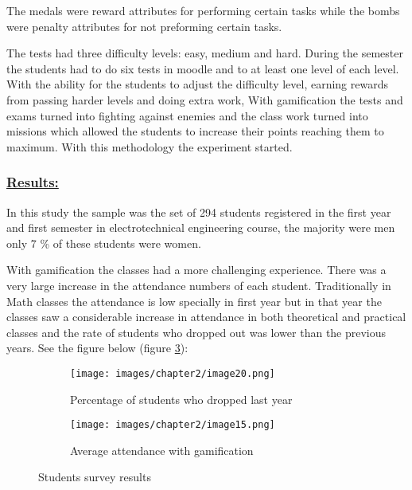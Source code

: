 \documentclass[../main.tex]{subfiles}
\begin{document}
The medals were reward attributes for performing certain tasks while the bombs were penalty attributes for not preforming certain tasks. 

The tests had three difficulty levels: easy, medium and hard. During the semester the students had to do six tests in moodle and to at least one level of each level. With the ability for the students to adjust the difficulty level, earning rewards from passing harder levels and doing extra work, With gamification the tests and exams turned into fighting against enemies and the class work turned into missions which allowed the students to increase their points reaching them to maximum. With this methodology the experiment started.

\subsubsection*{\underline{Results:}}

In this study the sample was the set of 294 students registered in the first year and first semester in electrotechnical engineering course, the majority were men only 7 \% of these students were women. 

With gamification the classes had a more challenging experience. There was a very large increase in the attendance numbers of each student. Traditionally in Math classes the attendance is low specially in first year but in that year the classes saw a considerable increase in attendance in both theoretical and practical classes and the rate of students who dropped out was lower than the previous years. See the figure below (figure \ref{fig:Students survey results}):
\begin{figure}[!ht]
     \centering
     \begin{subfigure}{0.4\textwidth}
         \centering
         \texttt{[image: images/chapter2/image20.png]}
         \caption{Percentage of students who dropped last year}
         \label{fig:Percentage of students who dropped last year}
     \end{subfigure}
     \begin{subfigure}{0.4\textwidth}
         \centering
         \texttt{[image: images/chapter2/image15.png]}
         \caption{Average attendance with gamification}
         \label{fig:Average attendance with gamification}
     \end{subfigure}
        \caption{Students survey results}
        \label{fig:Students survey results}
\end{figure}
\end{document}
